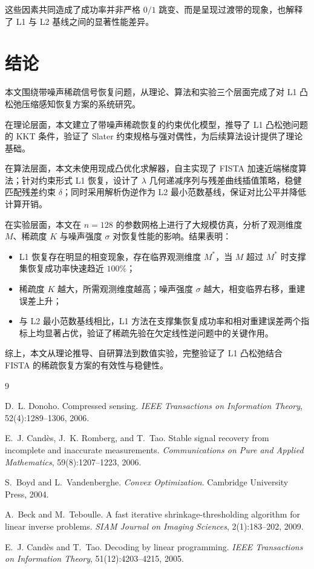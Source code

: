 \documentclass[UTF8]{ctexart}
\numberwithin{figure}{section}
\theoremstyle{definition}
\theoremstyle{examplestyle}
\theoremstyle{remark}
\begin{document}
这些因素共同造成了成功率并非严格 $0/1$ 跳变、而是呈现过渡带的现象，也解释了 L1 与 L2 基线之间的显著性能差异。

\section{结论}
\label{sec:conclusion}

本文围绕带噪声稀疏信号恢复问题，从理论、算法和实验三个层面完成了对 L1 凸松弛压缩感知恢复方案的系统研究。

在理论层面，本文建立了带噪声稀疏恢复的约束优化模型，推导了 L1 凸松弛问题的 KKT 条件，验证了 Slater 约束规格与强对偶性，为后续算法设计提供了理论基础。

在算法层面，本文未使用现成凸优化求解器，自主实现了 FISTA 加速近端梯度算法；针对约束形式 L1 恢复，设计了 $\lambda$ 几何递减序列与残差曲线插值策略，稳健匹配残差约束 $\delta$；同时采用解析伪逆作为 L2 最小范数基线，保证对比公平并降低计算开销。

在实验层面，本文在 $n=128$ 的参数网格上进行了大规模仿真，分析了观测维度 $M$、稀疏度 $K$ 与噪声强度 $\sigma$ 对恢复性能的影响。结果表明：
\begin{itemize}
\item L1 恢复存在明显的相变现象，存在临界观测维度 $M^*$，当 $M$ 超过 $M^*$ 时支撑集恢复成功率快速趋近 $100\%$；
\item 稀疏度 $K$ 越大，所需观测维度越高；噪声强度 $\sigma$ 越大，相变临界右移，重建误差上升；
\item 与 L2 最小范数基线相比，L1 方法在支撑集恢复成功率和相对重建误差两个指标上均显著占优，验证了稀疏先验在欠定线性逆问题中的关键作用。
\end{itemize}

综上，本文从理论推导、自研算法到数值实验，完整验证了 L1 凸松弛结合 FISTA 的稀疏恢复方案的有效性与稳健性。

\begin{thebibliography}{9}

D.~L. Donoho.
Compressed sensing.
\emph{IEEE Transactions on Information Theory}, 52(4):1289--1306, 2006.

E.~J. Cand\`es, J.~K. Romberg, and T.~Tao.
Stable signal recovery from incomplete and inaccurate measurements.
\emph{Communications on Pure and Applied Mathematics}, 59(8):1207--1223, 2006.

S.~Boyd and L.~Vandenberghe.
\emph{Convex Optimization}.
Cambridge University Press, 2004.

A.~Beck and M.~Teboulle.
A fast iterative shrinkage-thresholding algorithm for linear inverse problems.
\emph{SIAM Journal on Imaging Sciences}, 2(1):183--202, 2009.

E.~J. Cand\`es and T.~Tao.
Decoding by linear programming.
\emph{IEEE Transactions on Information Theory}, 51(12):4203--4215, 2005.

\end{thebibliography}
\end{document}
